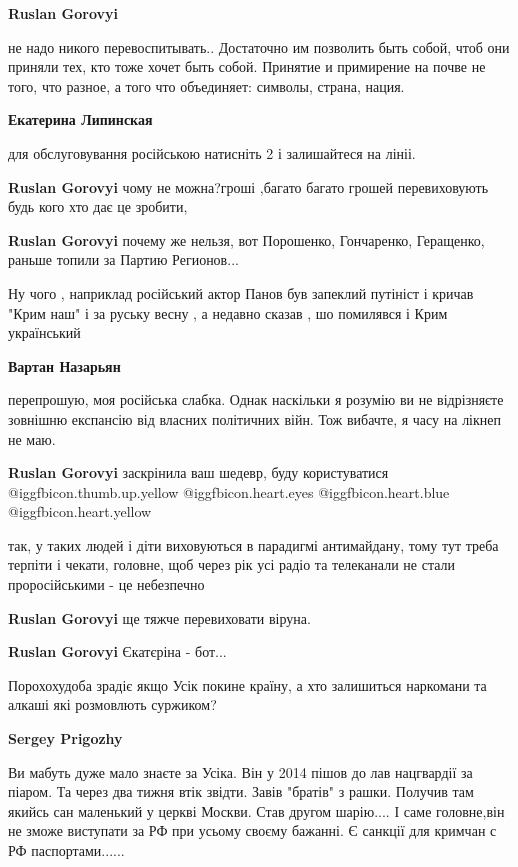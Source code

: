 \begin{itemize}
\begin{itemize}
\textbf{Ruslan Gorovyi} 

не надо никого перевоспитывать.. Достаточно им позволить быть собой, чтоб они
приняли тех, кто тоже хочет быть собой. Принятие и примирение на почве не того,
что разное, а того что объединяет: символы, страна, нация.


\textbf{Екатерина Липинская} 

для обслуговування російською натисніть 2 і залишайтеся на лініі.

\textbf{Ruslan Gorovyi} чому не можна?гроші ,багато багато грошей перевиховують
будь кого хто дає це зробити,

\textbf{Ruslan Gorovyi} почему же нельзя, вот Порошенко, Гончаренко, Геращенко, раньше топили за Партию Регионов...


Ну чого , наприклад російський актор Панов був запеклий путініст і кричав "Крим
наш" і за руську весну , а недавно сказав , шо помилявся і Крим український



\textbf{Вартан Назарьян} 

перепрошую, моя російська слабка. Однак наскільки я розумію ви не відрізняєте
зовнішню експансію від власних політичних війн. Тож вибачте, я часу на лікнеп
не маю.

\textbf{Ruslan Gorovyi} заскрінила ваш шедевр, буду користуватися @igg{fbicon.thumb.up.yellow}  @igg{fbicon.heart.eyes}  @igg{fbicon.heart.blue}  @igg{fbicon.heart.yellow} 


так, у таких людей і діти виховуються в парадигмі антимайдану, тому тут треба
терпіти і чекати, головне, щоб через рік усі радіо та телеканали не стали
проросійськими - це небезпечно

\textbf{Ruslan Gorovyi} ще тяжче перевиховати віруна.

\textbf{Ruslan Gorovyi} Єкатєріна - бот...

Порохохудоба зрадіє якщо Усік покине країну, а хто залишиться наркомани та алкаші які розмовлють суржиком?

\textbf{Sergey Prigozhy} 

Ви мабуть дуже мало знаєте за Усіка. Він у 2014 пішов до лав нацгвардії за
піаром. Та через два тижня втік звідти. Завів "братів" з рашки. Получив там
якийсь сан маленький у церкві Москви. Став другом шарію.... І саме головне,він
не зможе виступати за РФ при усьому своєму бажанні. Є санкції для кримчан с РФ
паспортами......



\end{itemize}
\end{itemize}

